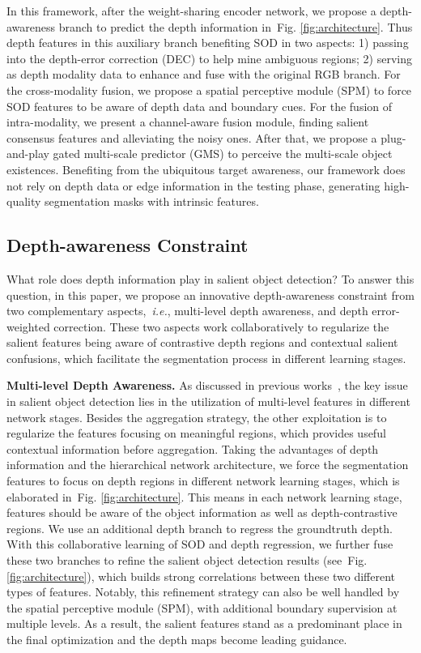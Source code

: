 \documentclass[journal]{IEEEtran}
\def\ie{{\em i.e.}}
\newcommand{\figref}[1]{Fig. \ref{#1}}
\begin{document}
In this framework, after the weight-sharing encoder network, we propose a depth-awareness branch to predict the depth information in~\figref{fig:architecture}. Thus depth features in this auxiliary branch benefiting SOD in two aspects: 1) passing into the depth-error correction (DEC) to help mine ambiguous regions; 2) serving as depth modality data to enhance and fuse with the original RGB branch. For the cross-modality fusion, we propose a spatial perceptive module (SPM) to force SOD features to be aware of depth data and boundary cues. For the fusion of intra-modality, we present a channel-aware fusion module, finding salient consensus features and alleviating the noisy ones.
After that, we propose a plug-and-play gated multi-scale predictor (GMS) to perceive the multi-scale object existences. Benefiting from the ubiquitous target awareness, our framework does not rely on depth data or edge information in the testing phase, generating high-quality segmentation masks with intrinsic features.


\subsection{Depth-awareness Constraint}
What role does depth information play in salient object detection? To answer this question, in this paper, we propose an innovative depth-awareness constraint from two complementary aspects,~\ie, multi-level depth awareness, and depth error-weighted correction. These two aspects work collaboratively to regularize the salient features being aware of contrastive depth regions and contextual salient confusions, which facilitate the segmentation process in different learning stages.

\textbf{Multi-level Depth Awareness.} As discussed in previous works~\cite{zhang2018progressive,fan2020bbs,chen2018progressively}, the key issue in salient object detection lies in the utilization of multi-level features in different network stages. Besides the aggregation strategy, the other exploitation is to regularize the features focusing on meaningful regions, which provides useful contextual information before aggregation. Taking the advantages of depth information and the hierarchical network architecture, we force the segmentation features to focus on depth regions in different network learning stages, which is elaborated in~\figref{fig:architecture}. This means in each network learning stage, features should be aware of the object information as well as depth-contrastive regions. We use an additional depth branch to regress the groundtruth depth. With this collaborative learning of SOD and depth regression, we further fuse these two branches to refine the salient object detection results (see~\figref{fig:architecture}), which builds strong correlations between these two different types of features. Notably, this refinement strategy can also be well handled by the spatial perceptive module (SPM), with additional boundary supervision at multiple levels. As a result, the salient features stand as a predominant place in the final optimization and the depth maps become leading guidance.
\end{document}
